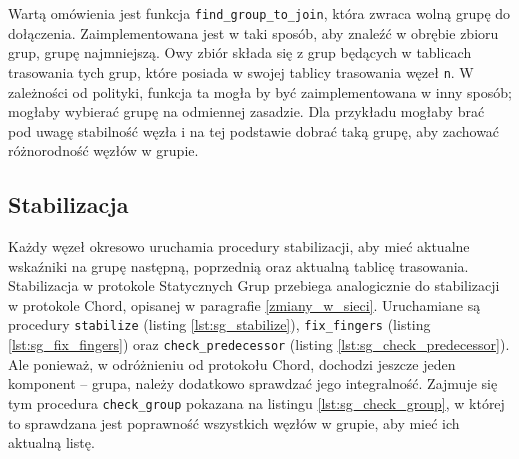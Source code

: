 \documentclass[12pt, twoside, openany]{report}
\begin{document}
Wartą omówienia jest funkcja \texttt{find\_group\_to\_join}, która zwraca wolną grupę do dołączenia. Zaimplementowana jest w taki sposób, aby znaleźć w obrębie zbioru grup, grupę najmniejszą. Owy zbiór składa się z grup będących w tablicach trasowania tych grup, które posiada w swojej tablicy trasowania węzeł \texttt{n}. W zależności od polityki, funkcja ta mogła by być zaimplementowana w inny sposób; mogłaby wybierać grupę na odmiennej zasadzie. Dla przykładu mogłaby brać pod uwagę stabilność węzła i na tej podstawie dobrać taką grupę, aby zachować różnorodność węzłów w grupie.






\subsection{Stabilizacja}

Każdy węzeł okresowo uruchamia procedury stabilizacji, aby mieć aktualne wskaźniki na grupę następną, poprzednią oraz aktualną tablicę trasowania. Stabilizacja w protokole Statycznych Grup przebiega analogicznie do stabilizacji w protokole Chord, opisanej w paragrafie \ref{zmiany_w_sieci}. Uruchamiane są procedury \texttt{stabilize} (listing \ref{lst:sg_stabilize}), \texttt{fix\_fingers} (listing \ref{lst:sg_fix_fingers}) oraz \texttt{check\_predecessor} (listing \ref{lst:sg_check_predecessor}). Ale ponieważ, w odróżnieniu od protokołu Chord, dochodzi jeszcze jeden komponent -- grupa, należy dodatkowo sprawdzać jego integralność. Zajmuje się tym procedura \texttt{check\_group} pokazana na listingu \ref{lst:sg_check_group}, w której to sprawdzana jest poprawność wszystkich węzłów w grupie, aby mieć ich aktualną listę.




\end{document}
